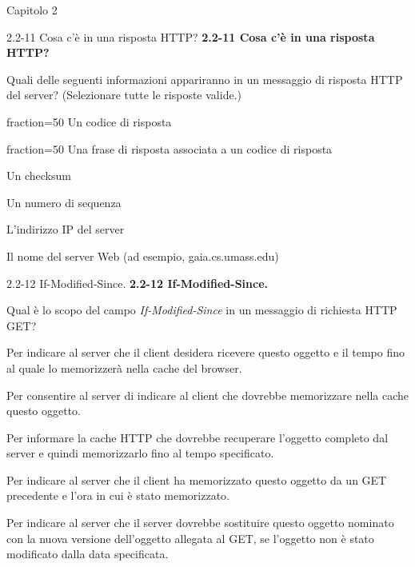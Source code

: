 \documentclass[a4paper]{article}
\begin{document}
\begin{quiz}{Capitolo 2}
    
\begin{multi}[points=1,shuffle,multiple]{2.2-11 Cosa c'è in una risposta HTTP?}
\textbf{2.2-11 Cosa c'è in una risposta HTTP?}

Quali delle seguenti informazioni appariranno in un messaggio di risposta HTTP del server? (Selezionare tutte le risposte valide.)

\item[fraction=50] Un codice di risposta
\item[fraction=50] Una frase di risposta associata a un codice di risposta
\item Un checksum
\item Un numero di sequenza
\item L'indirizzo IP del server
\item Il nome del server Web (ad esempio, gaia.cs.umass.edu)
\end{multi}
    

\begin{multi}[points=1,shuffle]{2.2-12 If-Modified-Since.}
\textbf{2.2-12 If-Modified-Since.}

Qual è lo scopo del campo \emph{If-Modified-Since} in un messaggio di richiesta HTTP GET?

\item Per indicare al server che il client desidera ricevere questo oggetto e il tempo fino al quale lo memorizzerà nella cache del browser.
\item Per consentire al server di indicare al client che dovrebbe memorizzare nella cache questo oggetto.
\item Per informare la cache HTTP che dovrebbe recuperare l'oggetto completo dal server e quindi memorizzarlo fino al tempo specificato.
\item* Per indicare al server che il client ha memorizzato questo oggetto da un GET precedente e l'ora in cui è stato memorizzato.
\item Per indicare al server che il server dovrebbe sostituire questo oggetto nominato con la nuova versione dell'oggetto allegata al GET, se l'oggetto non è stato modificato dalla data specificata.
\end{multi}
    


\end{quiz}
\end{document}
